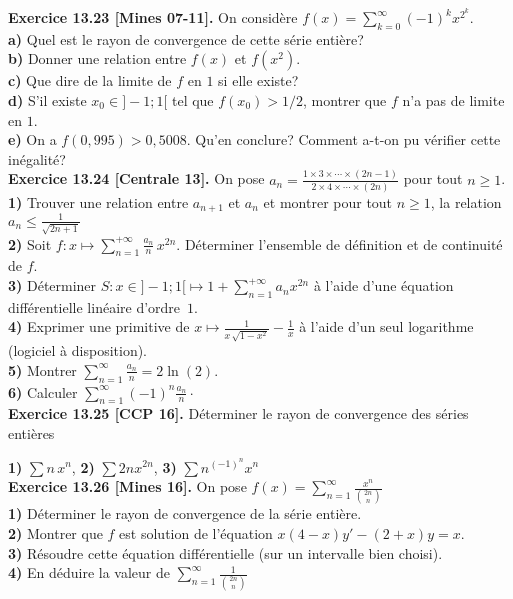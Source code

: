 \documentclass[a4paper,12pt,francais]{article}
\begin{document}
\noindent
{\bf Exercice 13.23 [Mines 07-11].} On considère $\displaystyle f(x)=\sum_{k=0}^\infty (-1)^k x^{2^k}$.\\
\indent
{\bf a)} Quel est le rayon de convergence de cette série entière?\\
\indent
{\bf b)} Donner une relation entre $f(x)$ et $f(x^2)$.\\
\indent
{\bf c)} Que dire de la limite de $f$ en $1$ si elle existe?\\
\indent
{\bf d)} S'il existe $x_0\in]-1;1[$ tel que $f(x_0)>1/2$, montrer que $f$ n'a pas de limite en $1$.\\
\indent
{\bf e)} On a $f(0,995)>0,5008$. Qu'en conclure? Comment a-t-on pu vérifier cette inégalité?\\

\noindent
{\bf Exercice 13.24 [Centrale 13].} On pose $ a_n=\frac{1\! \times \!3 \times \cdots \times(2n-1)}{2 \! \times \! 4 \times \cdots \times (2n)}$ pour tout $n\geqslant 1$.\\
{\bf 1)} Trouver une relation entre $a_{n+1}$ et $a_n$ et montrer pour tout $n\geqslant 1$, la relation $a_n \leqslant \frac{1}{\sqrt{2n+1}}$\\
{\bf 2)} Soit $f: x\mapsto \displaystyle \sum_{n=1}^{+\infty} \frac{a_n}{n} \, x^{2n}$.
Déterminer l'ensemble de définition et de continuité de $f$.\\
{\bf 3)} Déterminer $\displaystyle S : x \in ]-1;1[\mapsto 1+\sum_{n=1}^{+\infty} a_n x^{2n}$ à l'aide d'une équation différentielle linéaire d'ordre~$1$.\\
{\bf 4)} Exprimer une primitive de $x\mapsto \frac{1}{x\, \sqrt{1-x^2}}-\frac{1}{x}$ à l'aide d'un seul logarithme (logiciel à disposition).\\
{\bf 5)} Montrer $\displaystyle \sum_{n=1}^\infty \frac{a_n}{n}= 2\ln(2)$.\\
{\bf 6)} Calculer $\displaystyle \sum_{n=1}^{\infty} (-1)^n \frac{a_n}{n} \cdot$\\
  
\noindent
{\bf Exercice 13.25 [CCP 16].} %
Déterminer le rayon de convergence des séries entières 

\indent
{\bf 1)} $\sum n\, x^n$,
\indent
{\bf 2)} $\sum 2n x^{2n}$,
\indent
{\bf 3)} $\sum  
n^{(-1)^n} x^n$\\

\noindent
{\bf Exercice 13.26 [Mines 16].} %
On pose $\displaystyle f(x)=\sum_{n=1}^\infty \frac{x^n}{\binom{2n}{n}}$\\
{\bf 1)} Déterminer le rayon de convergence de la série entière.\\
{\bf 2)} Montrer que $f$ est solution de l'équation $x(4-x)y'-(2+x)y=x$.\\
{\bf 3)} Résoudre cette équation différentielle (sur un intervalle bien choisi).\\
{\bf 4)} En déduire la valeur de  $\displaystyle \sum_{n=1}^\infty \frac{1}{\binom{2n}{n}}$\\
\end{document}
